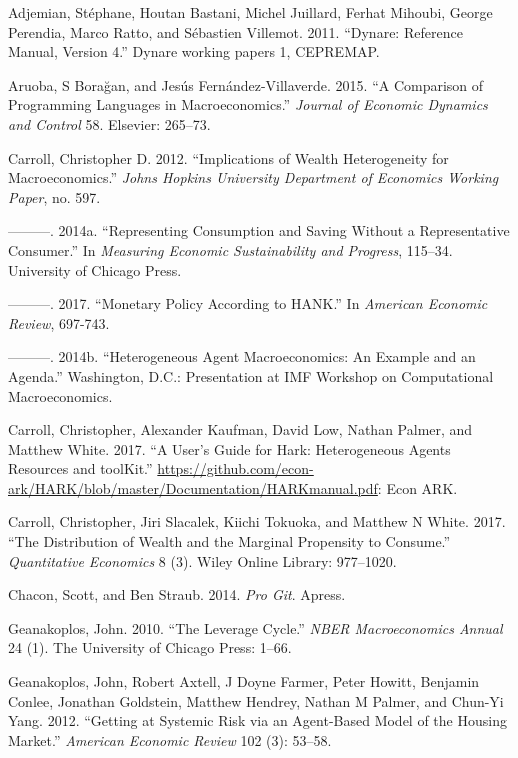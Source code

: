 \documentclass[10pt,twocolumn]{article}
\begin{document}
\hypertarget{refs}{}
\hypertarget{ref-adjemian2011dynare}{}
Adjemian, Stéphane, Houtan Bastani, Michel Juillard, Ferhat Mihoubi,
George Perendia, Marco Ratto, and Sébastien Villemot. 2011. ``Dynare:
Reference Manual, Version 4.'' Dynare working papers 1, CEPREMAP.

\hypertarget{ref-aruoba2015comparison}{}
Aruoba, S Borağan, and Jesús Fernández-Villaverde. 2015. ``A Comparison
of Programming Languages in Macroeconomics.'' \emph{Journal of Economic
Dynamics and Control} 58. Elsevier: 265--73.

\hypertarget{ref-carroll2012implications}{}
Carroll, Christopher D. 2012. ``Implications of Wealth Heterogeneity for
Macroeconomics.'' \emph{Johns Hopkins University Department of Economics
Working Paper}, no. 597.

\hypertarget{ref-carroll2014representing}{}
---------. 2014a. ``Representing Consumption and Saving Without a
Representative Consumer.'' In \emph{Measuring Economic Sustainability
and Progress}, 115--34. University of Chicago Press.

\hypertarget{ref-kmvHANK}{}
---------. 2017. ``Monetary Policy According to HANK.'' In \emph{American Economic Review}, 697-743. 

\hypertarget{ref-carroll2014imfheterogeneousagentmacro}{}
---------. 2014b. ``Heterogeneous Agent Macroeconomics: An Example and
an Agenda.'' Washington, D.C.: Presentation at IMF Workshop on
Computational Macroeconomics.

\hypertarget{ref-carroll2017harkmanual}{}
Carroll, Christopher, Alexander Kaufman, David Low, Nathan Palmer, and
Matthew White. 2017. ``A User's Guide for Hark: Heterogeneous Agents
Resources and toolKit.''
\url{https://github.com/econ-ark/HARK/blob/master/Documentation/HARKmanual.pdf}:
Econ ARK.

\hypertarget{ref-carroll2017distribution}{}
Carroll, Christopher, Jiri Slacalek, Kiichi Tokuoka, and Matthew N
White. 2017. ``The Distribution of Wealth and the Marginal Propensity to
Consume.'' \emph{Quantitative Economics} 8 (3). Wiley Online Library:
977--1020.

\hypertarget{ref-chacon2014pro}{}
Chacon, Scott, and Ben Straub. 2014. \emph{Pro Git}. Apress.

\hypertarget{ref-geanakoplos2010leverage}{}
Geanakoplos, John. 2010. ``The Leverage Cycle.'' \emph{NBER
Macroeconomics Annual} 24 (1). The University of Chicago Press: 1--66.

\hypertarget{ref-geanakoplos2012getting}{}
Geanakoplos, John, Robert Axtell, J Doyne Farmer, Peter Howitt, Benjamin
Conlee, Jonathan Goldstein, Matthew Hendrey, Nathan M Palmer, and
Chun-Yi Yang. 2012. ``Getting at Systemic Risk via an Agent-Based Model
of the Housing Market.'' \emph{American Economic Review} 102 (3):
53--58.
\end{document}
